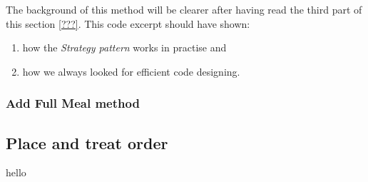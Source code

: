The background of this method will be clearer after having read the third part of this section \ref{???}. This code excerpt should have shown:

\begin{enumerate}
	\item how the \emph{Strategy pattern} works in practise and
	\item how we always looked for efficient code designing.
\end{enumerate}


\subsubsection{Add Full Meal method} %
\label{ssub:add_full_meal_method}












\subsection{Place and treat order} %
\label{sub:place_and_treat_order}

hello




